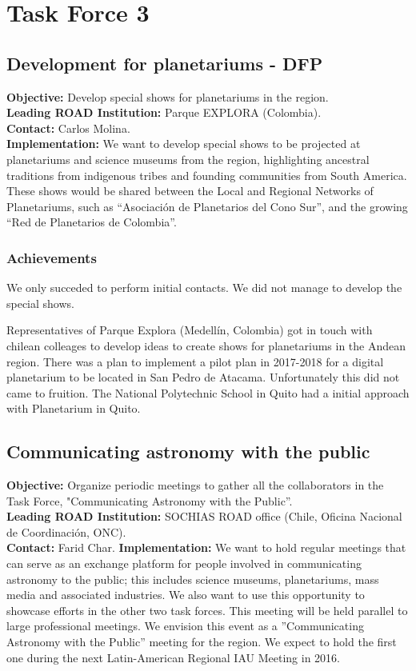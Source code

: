 \newpage
\section{Task Force 3}
\label{chapter 4}


\subsection{Development for planetariums - DFP}
\textbf{Objective:} Develop special shows for planetariums in the region.
\\
\textbf{Leading ROAD Institution:} Parque EXPLORA (Colombia).
\\
\textbf{Contact:} Carlos Molina.
\\
\textbf{Implementation:} We want to develop special shows to be projected at planetariums and science museums from the region, highlighting ancestral traditions from indigenous tribes and founding communities from South America.
These shows would be shared between the Local and Regional Networks of Planetariums, such as “Asociación de Planetarios
del Cono Sur”, and the growing “Red de Planetarios de Colombia”.

\subsubsection{Achievements}

We only succeded to perform initial contacts.
We did not manage to develop the special shows.


Representatives of Parque Explora (Medellín, Colombia) got in touch with chilean colleages to develop ideas to create shows for planetariums in the Andean region. There was a plan to implement a pilot plan in 2017-2018 for a digital planetarium to be located in San Pedro de Atacama.
Unfortunately this did not came to fruition.
The National Polytechnic School in Quito had a initial approach with Planetarium in Quito. 

\subsection{Communicating astronomy with the public}
\textbf{Objective:} Organize periodic meetings to gather all the collaborators in the Task Force, "Communicating Astronomy with the Public”.
\\
\textbf{Leading ROAD Institution:} SOCHIAS ROAD office (Chile, Oficina Nacional de Coordinación, ONC).
\\
\textbf{Contact:} Farid Char.
\textbf{Implementation:} We want to hold regular meetings that can serve as an exchange platform for people involved in communicating astronomy to the public; this includes science museums, planetariums, mass media and associated industries. We also want to use this opportunity to showcase efforts in the other two task forces. This meeting will be
held parallel to large professional meetings. We envision this event as a ”Communicating Astronomy with the Public” meeting for the region. We expect to hold the first one during the next Latin-American Regional IAU Meeting in 2016.


